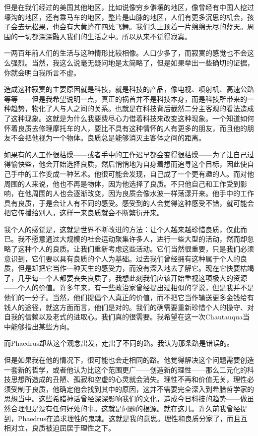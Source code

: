\documentclass[UTF8]{article}
\begin{document}
\par 但是在我们经过的美国其他地区，比如说像穷乡僻壤的地区，像曾经有中国人挖过壕沟的地区，还有乘马车的地区，整片是山脉的地区，人们有更多沉思的机会，孩子会去玩松果，也会有大黄蜂在四处飞舞。我们头上顶着一片绵绵无尽的蓝天。周围的一切都深深融入我们的生活之中。所以从来不觉得寂寞。
\par 一两百年前人们的生活与这种情形比较相像。人口少多了，而寂寞的感觉也不会这么强烈。当然，我这么说毫无疑问地是太简略了，但是如果举出一些确切的证据，你就会明白我所言不虚。
\par 造成这种寂寞的主要原因就是科技，就是科技的产品，像电视、喷射机、高速公路等等——但是我希望说明一点，真正的祸首并不是科技本身，而是科技所带来的一种趋势，物化了人与人之间的关系。也就是在科技背后截然二分主客观的看法造成了这种现象。这就是为什么我要费尽心力借着科技来改变这种现象。一个知道如何怀着良质去修理摩托车的人，要比不具有这种情怀的人有更多的朋友，而且他的朋友不会把他视为一个物体。良质总是能够消灭主客体之间的距离。
\par 如果有的人工作很枯燥——或者手中的工作迟早都会变得很枯燥——为了让自己过得愉快些，他会开始选择良质，然后悄悄地为自身着想而追寻这个目标，因此使自己手中的工作变成一种艺术。他很可能会发现，自己成了一个更有趣的人。而对他周围的人来说，他也不再是物体，因为他选择了良质。不只他自己和工作受到影响，在他周围的人也会逐渐改变，因为良质会像水波一样荡漾开来。他手中的工作具有良质，于是会让人有不同的感受。感受到的人会觉得这种感受不错，就可能会把它传播给别人，这样一来良质就会不断繁衍开来。
\par 我个人的感觉是，这就是世界不断改进的方法：让个人越来越珍惜良质，仅此而已。我不愿意通过大规模的社会运动聚集许多人，进行一些大型的活动，然而却忽略了这种个人的良质。让我们重新考虑这些活动。它们当然很重要，只是我们必须意识到，它们要以具有良质的个人为基础。过去我们曾经拥有这种属于个人的良质，但是却把它当作一种天生的感受力，而没有深入地去了解它。现在它快要枯竭了，几乎每一个人都要丧失良质了，我想此刻我们应该开始重视这项极大的资源——个人的价值。许多年来，有一些政治家曾经提出过相似的学说，但是我并不是他们的一分子。当然，他们提倡个人真正的价值，而不把它当作输送更多金钱给有钱人的途径，就这方面而言，他们是对的。我们的确需要重新珍惜个人的操守、对自我的信赖以及老式的进取心。我们真的很需要。我希望在这一次Chautauqua当中能够指出某些方向。
\par 而Phaedrus却从这个观念出发，走出了不同的路。我认为那条路是错误的。
\par 但是如果我在他的情况下，很可能也会走相同的路。他觉得解决这个问题需要创造一套新的哲学，或者他认为比这个范围更广——创造新的理性——那么二元化的科技思想所造成的丑陋、孤寂和空虚的心灵就会消失。理性不再和价值无关，理性必须受制于良质，他确定他会找到其中的原因，这并不需要完全深入到希腊哲学家的思想当中。这些希腊神话曾经深深影响我们的文化，造成今日科技的趋势——做虽然合理但是没有任何好处的事。这就是问题的根源。就在这儿。许久前我曾经提到，Phaedrus在追求理性的鬼魂。这就是我的意思。理性和良质分家了，而且互相对立，良质被迫屈居于理性之下。
\end{document}
